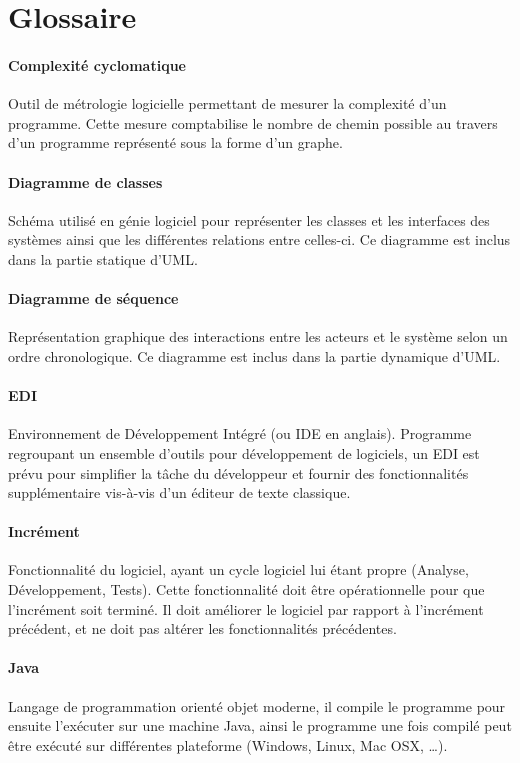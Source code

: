 \documentclass[12pt,a4paper,openany]{article}
\begin{document}
\section{Glossaire}
	\paragraph{Complexité cyclomatique} Outil de métrologie logicielle permettant de mesurer la complexité d'un programme. Cette mesure comptabilise le nombre de chemin possible au travers d'un programme représenté sous la forme d'un graphe.
	\paragraph{Diagramme de classes} Schéma utilisé en génie logiciel pour représenter les classes et les interfaces des systèmes
	ainsi que les différentes relations entre celles-ci. Ce diagramme est inclus dans la partie statique d'UML.
	\paragraph{Diagramme de séquence} Représentation graphique des interactions entre les acteurs et le système selon un ordre 
	chronologique. Ce diagramme est inclus dans la partie dynamique d'UML.
	\paragraph{EDI} Environnement de Développement Intégré (ou IDE en anglais). Programme regroupant un ensemble d'outils pour développement de logiciels, un EDI
	est prévu pour simplifier la tâche du développeur et fournir des fonctionnalités supplémentaire vis-à-vis d'un éditeur de texte classique.
	\paragraph{Incrément} Fonctionnalité du logiciel, ayant un cycle logiciel lui étant propre (Analyse, Développement, Tests). Cette 
	fonctionnalité doit être opérationnelle pour que l'incrément soit terminé. Il doit améliorer le logiciel par rapport à l'incrément précédent, 
	et ne doit pas altérer les fonctionnalités précédentes.
	\paragraph{Java} Langage de programmation orienté objet moderne, il compile le programme pour ensuite l'exécuter sur une machine Java, ainsi le programme une fois
	compilé peut être exécuté sur différentes plateforme (Windows, Linux, Mac OSX, \ldots).
\end{document}
